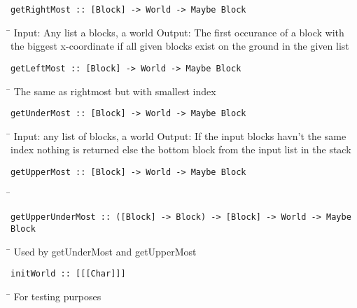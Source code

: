 \begin{verbatim}
getRightMost :: [Block] -> World -> Maybe Block
\end{verbatim}
\begin{tabbing}
\hspace*{1cm}\= \kill
\> Input: Any list a blocks, a world Output: The first occurance of a block with \\
\> the biggest x-coordinate if all given blocks exist on the ground in the given list
\end{tabbing}
\begin{verbatim}
getLeftMost :: [Block] -> World -> Maybe Block
\end{verbatim}
\begin{tabbing}
\hspace*{1cm}\= \kill
\> The same as rightmost but with smallest index
\end{tabbing}
\begin{verbatim}
getUnderMost :: [Block] -> World -> Maybe Block
\end{verbatim}
\begin{tabbing}
\hspace*{1cm}\= \kill
\> Input: any list of blocks, a world Output: If the input blocks havn’t the same \\
\> index nothing is returned else the bottom block from the input list in the stack
\end{tabbing}
\begin{verbatim}
getUpperMost :: [Block] -> World -> Maybe Block
\end{verbatim}
\begin{tabbing}
\hspace*{1cm}\= \kill
\> 
\end{tabbing}
\begin{verbatim}
getUpperUnderMost :: ([Block] -> Block) -> [Block] -> World -> Maybe Block
\end{verbatim}
\begin{tabbing}
\hspace*{1cm}\= \kill
\> Used by getUnderMost and getUpperMost
\end{tabbing}
\begin{verbatim}
initWorld :: [[[Char]]]
\end{verbatim}
\begin{tabbing}
\hspace*{1cm}\= \kill
\> For testing purposes
\end{tabbing}
